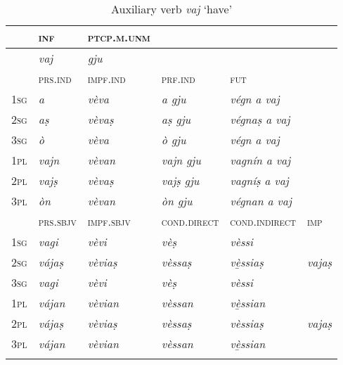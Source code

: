 \begin{table}
\caption{Auxiliary verb \textit{vaj} `have'}
\label{tab:aux:vaj}
 \begin{tabular}{llllll}
 
  \lsptoprule
& \textsc{inf}  & \textsc{ptcp.m.unm} \\
  \midrule
&  \textit{vaj} &\textit{gju} \\
     
  \lsptoprule
&\textsc{prs.ind}  &\textsc{impf.ind} & \textsc{prf.ind} & \textsc{fut}\\
   \midrule
\textsc{1sg} &\textit{a} & \textit{vèva} & \textit{a gju} & \textit{végn a vaj}\\
\textsc{2sg} &\textit{aṣ} & \textit{vèvaṣ} & \textit{aṣ gju} & \textit{végnaṣ a vaj}\\
\textsc{3sg} &\textit{ò} & \textit{vèva} & \textit{ò gju} &\textit{végn a vaj}\\
\textsc{1pl} &\textit{vajn} & \textit{vèvan} & \textit{vajn gju} &\textit{vagnín a vaj}\\
\textsc{2pl} &\textit{vajṣ} & \textit{vèvaṣ} & \textit{vajṣ gju} &\textit{vagníṣ a vaj}\\
\textsc{3pl}& \textit{òn} & \textit{vèvan} & \textit{òn gju} &\textit{végnan a vaj}\\

 \lsptoprule
&\textsc{prs.sbjv} & \textsc{impf.sbjv}  &\textsc{cond.direct} & \textsc{cond.indirect} & \textsc{imp} \\
\midrule
\textsc{1sg} & \textit{vagi}& \textit{vèvi} & \textit{vèṣ} & \textit{vèssi}\\
\textsc{2sg} & \textit{vájaṣ}& \textit{vèviaṣ} & \textit{vèssaṣ} & \textit{vè̱ssiaṣ} &  \textit{vajaṣ}\\
\textsc{3sg} & \textit{vagi} & \textit{vèvi} & \textit{vèṣ} & \textit{vèssi}\\
\textsc{1pl} & \textit{vájan}& \textit{vèvian} & \textit{vèssan} & \textit{vè̱ssian}\\
\textsc{2pl} & \textit{vájaṣ}& \textit{vèviaṣ} & \textit{vèssaṣ}& \textit{vèssiaṣ} &  \textit{vajaṣ}\\
\textsc{3pl} & \textit{vájan}& \textit{vèvian} & \textit{vèssan} & \textit{vè̱ssian}\\
  \lspbottomrule
 \end{tabular}
\end{table}

